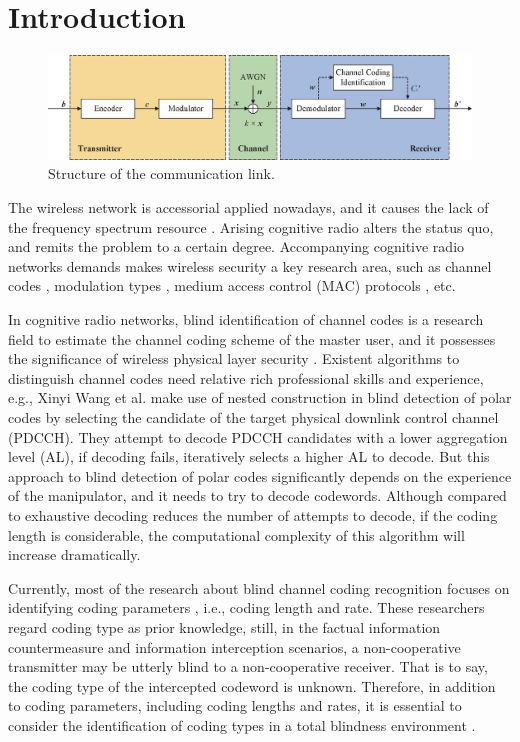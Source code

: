 \documentclass[conference]{IEEEtran}
\begin{document}
\section{Introduction}

\begin{figure}[htbp]
	\centerline{\includegraphics[scale=0.63]{figure-1-01.eps}}
	\caption{Structure of the communication link.}%
\end{figure}

The wireless network is accessorial applied nowadays, and it causes the lack of the frequency spectrum resource \cite{wang2020high}. Arising cognitive radio alters the status quo, and remits the problem to a certain degree. Accompanying cognitive radio networks \cite{shakhov2021analysis} demands makes wireless security a key research area, such as channel codes \cite{zhang2022blind}, modulation types \cite{chu2021automatic}, medium access control (MAC) protocols \cite{gao2021mac, gao2020mac}, etc.

In cognitive radio networks, blind identification of channel codes \cite{sun2020efficient, jalali2020joint, ju2020path} is a research field to estimate the channel coding scheme of the master user, and it possesses the significance of wireless physical layer security \cite{sanchez2020physical}. Existent algorithms to distinguish channel codes need relative rich professional skills and experience, e.g., Xinyi Wang \cite{wang2020nested} et al. make use of nested construction in blind detection of polar codes by selecting the candidate of the target physical downlink control channel (PDCCH). They attempt to decode PDCCH candidates with a lower aggregation level (AL), if decoding fails, iteratively selects a higher AL to decode. But this approach to blind detection of polar codes significantly depends on the experience of the manipulator, and it needs to try to decode codewords. Although compared to exhaustive decoding reduces the number of attempts to decode, if the coding length is considerable, the computational complexity of this algorithm will increase dramatically.

Currently, most of the research about blind channel coding recognition focuses on identifying coding parameters \cite{song2021blind, liu2020blind, wu2020blind, kwon2020analysis, dean2018blind, perlstein2018fast}, i.e., coding length and rate. These researchers regard coding type as prior knowledge, still, in the factual information countermeasure and information interception scenarios, a non-cooperative transmitter may be utterly blind to a non-cooperative receiver. That is to say, the coding type of the intercepted codeword is unknown. Therefore, in addition to coding parameters, including coding lengths and rates, it is essential to consider the identification of coding types in a total blindness environment \cite{bonvard2018classification}. 
\end{document}
